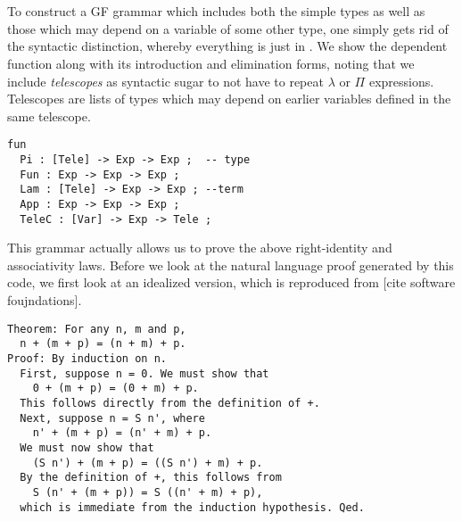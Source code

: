 \begin{code}
\AgdaSymbol{(}\AgdaSpace{}%
\AgdaOperator{\AgdaFunction{+}}\AgdaSpace{}%
\AgdaSymbol{))}\<%
\\
\>[0]\AgdaSpace{}%
\AgdaSpace{}%
\AgdaSpace{}%
\AgdaSpace{}%
\AgdaSymbol{=}\AgdaSpace{}%
\<%
\\
\>[0]\AgdaSpace{}%
\AgdaSymbol{(}\AgdaSpace{}%
\AgdaSymbol{)}\AgdaSpace{}%
\AgdaSpace{}%
\AgdaSpace{}%
\AgdaSymbol{=}\AgdaSpace{}%
\AgdaSpace{}%
\AgdaSpace{}%
\AgdaSymbol{(}\AgdaSpace{}%
\AgdaSpace{}%
\AgdaSpace{}%
\AgdaSymbol{)}\<%
\end{code}

To construct a GF grammar which includes both the simple types as well as those
which may depend on a variable of some other type, one simply gets rid of the
syntactic distinction, whereby everything is just in . We show the
dependent function along with its introduction and elimination forms, noting
that we include \emph{telescopes} as syntactic sugar to not have to repeat
$\lambda$ or $\Pi$ expressions. Telescopes are lists of types which may depend
on earlier variables defined in the same telescope.

\begin{verbatim}
fun
  Pi : [Tele] -> Exp -> Exp ;  -- type
  Fun : Exp -> Exp -> Exp ;
  Lam : [Tele] -> Exp -> Exp ; --term
  App : Exp -> Exp -> Exp ;
  TeleC : [Var] -> Exp -> Tele ;
\end{verbatim}

This grammar actually allows us to prove the above right-identity and
associativity laws. Before we look at the natural language proof generated by
this code, we first look at an idealized version, which is reproduced from [cite
software foujndations].

\begin{verbatim}
Theorem: For any n, m and p,
  n + (m + p) = (n + m) + p.
Proof: By induction on n.
  First, suppose n = 0. We must show that
    0 + (m + p) = (0 + m) + p.
  This follows directly from the definition of +.
  Next, suppose n = S n', where
    n' + (m + p) = (n' + m) + p.
  We must now show that
    (S n') + (m + p) = ((S n') + m) + p.
  By the definition of +, this follows from
    S (n' + (m + p)) = S ((n' + m) + p),
  which is immediate from the induction hypothesis. Qed.
\end{verbatim}

